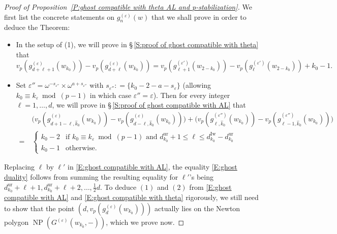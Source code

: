 \documentclass[12pt]{amsart}
\theoremstyle{definition}
\numberwithin{equation}{subsection}
\DeclareMathOperator{\NP}{NP}
\newcommand{\Iw}{\mathrm{Iw}}
\newcommand{\unr}{\mathrm{ur}}
\begin{document}
\begin{proof}[Proof of Proposition~\ref{P:ghost compatible with theta AL and p-stabilization}]
We first list the concrete statements on $g_n^{(\varepsilon)}(w)$ that we shall prove in order to deduce the Theorem:
\begin{itemize}
\item[(a)] In the setup of (1),
we will prove in \S\,\ref{S:proof of ghost compatible with theta} that
\begin{equation}
\label{E:ghost compatible with theta}
v_p(g^{(\varepsilon)}_{d+\ell+1}(w_{k_0}))-v_p(g^{(\varepsilon)}_{d+\ell}(w_{k_0})) = v_p(g^{(\varepsilon')}_{\ell+1}(w_{2-{k_0}}))-v_p(g^{(\varepsilon')}_{\ell}(w_{2-{k_0}})) +{k_0}-1.
\end{equation}
\item[(b)]
Set $\varepsilon'' = \omega^{-s_{\varepsilon''}} \times \omega^{a+s_{\varepsilon''}}$ with $s_{\varepsilon''}: = \{{k_0}-  2-a-s_\varepsilon\}$ (allowing $k_0\equiv k_\varepsilon \bmod{(p-1)}$ in which case $\varepsilon''= \varepsilon$).
Then for every integer $\ell =1, \dots, d$, we will prove in \S\,\ref{S:proof of ghost compatible with AL} that
\begin{align}
\label{E:ghost compatible with AL}
&\big(v_p(g^{(\varepsilon)}_{d+1-\ell, \hat k_0}(w_{k_0})) - v_p(g^{(\varepsilon)}_{d-\ell, \hat k_0}(w_{k_0})) \big) + \big(v_p(g^{(\varepsilon'')}_{\ell, \hat k_0}(w_{k_0})) - v_p(g^{(\varepsilon'')}_{\ell-1, \hat k_0}(w_{k_0})) \big) 
\\
\nonumber
=\ & \begin{cases}
{k_0}-2 & \textrm{if }k_0\equiv k_\varepsilon \bmod{(p-1)} \textrm{ and }d_{k_0}^\unr +1\leq  \ell \leq d_{k_0}^\Iw-d_{k_0}^\unr
\\
{k_0}-1 & \textrm{otherwise.}
\end{cases}
\end{align}
\end{itemize}
Replacing $\ell$ by $\ell'$ in \eqref{E:ghost compatible with AL}, the equality \eqref{E:ghost duality} follows from summing the resulting equality for $\ell'$'s being $d_{k_0}^{\unr} + \ell+1, d_{k_0}^{\unr} +\ell+2, \dots, \frac12 d$. To deduce $(1)$ and $(2)$ from \eqref{E:ghost compatible with AL} and \eqref{E:ghost compatible with theta} rigorously, we still need to show that the point $(d, v_p(g_d^{(\varepsilon)}(w_{k_0})))$ actually lies on the Newton polygon $\NP(G^{(\varepsilon)}(w_{k_0}, -))$, which we prove now.


\end{proof}
\end{document}
